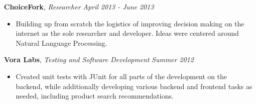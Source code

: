 \documentclass[9pt]{article}
\newenvironment{changemargin}[2]{%
  \begin{list}{}{%
    \setlength{\topsep}{0pt}%
    \setlength{\leftmargin}{#1}%
    \setlength{\rightmargin}{#2}%
    \setlength{\listparindent}{\parindent}%
    \setlength{\itemindent}{\parindent}%
    \setlength{\parsep}{\parskip}%
  }%
  \item[]}{\end{list}
}
\newenvironment{body} {
	\vspace*{-16pt}
	\begin{changemargin}{-0.25in}{-0.5in}
  }	
	{\end{changemargin}
}
\begin{document}
\begin{body}
\begin{itemize}
	\end{itemize}
	\vspace*{-3pt}
	\textbf{ChoiceFork}, \emph{Researcher} \hfill \emph{April 2013 - June 2013}\\
	\vspace*{-3pt}
	\begin{itemize} \itemsep -0pt  %
		\item Building up from scratch the logistics of improving decision making on the internet as the sole researcher and developer. Ideas were centered around Natural Language Processing.
	\end{itemize}
\smallskip
	\vspace*{-5pt}
	\textbf{Vora Labs}, \emph{Testing and Software Development} \hfill \emph{Summer 2012}\\
	\vspace*{-5pt}
	\begin{itemize} \itemsep -0pt  %
		\item Created unit tests with JUnit for all parts of the development on the backend, while additionally developing various backend and frontend tasks as needed, including product search recommendations.
	\end{itemize}
	\vspace*{-3pt}
\smallskip

	
\end{body}

\end{document}
